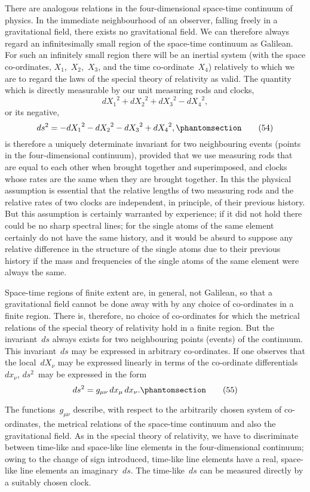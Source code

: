 \documentclass[12pt]{book}[2005/09/16]
\newcommand{\Change}[2]{#2}
\newcommand{\Add}[1]{\Change{}{#1}}
\newcommand{\PageSep}[1]{\ignorespaces}
\newcommand{\Tag}[1]{%
  \phantomsection
  \label{eqn:#1}
  \tag*{#1}
}
\begin{document}
There are analogous relations in the four-dimensional
\PageSep{70}
space-time continuum of physics. In the immediate
neighbourhood of an observer, falling freely in a gravitational
field, there exists no gravitational field. We
can therefore always regard an infinitesimally small
region of the space-time continuum as Galilean. For
such an infinitely small region there will be an inertial
system (with the space co-ordinates, $X_{1}$,~$X_{2}$,~$X_{3}$, and the
time co-ordinate~$X_{4}$) relatively to which we are to regard
the laws of the special theory of relativity as valid. The
quantity which is directly measurable by our unit
measuring rods and clocks,
\[
{dX_{1}}^{2} + {dX_{2}}^{2} + {dX_{3}}^{2} - {dX_{4}}^{2}\Add{,}
\]
or its negative,
\[
ds^{2} = -{dX_{1}}^{2} - {dX_{2}}^{2} - {dX_{3}}^{2} + {dX_{4}}^{2}\Add{,}
\Tag{(54)}
\]
is therefore a uniquely determinate invariant for two
neighbouring events (points in the four-dimensional
continuum), provided that we use measuring rods that
are equal to each other when brought together and
superimposed, and clocks whose rates are the same
when they are brought together. In this the physical
assumption is essential that the relative lengths of two
measuring rods and the relative rates of two clocks are
independent, in principle, of their previous history. But
this assumption is certainly warranted by experience;
if it did not hold there could be no sharp spectral lines;
for the single atoms of the same element certainly do
not have the same history, and it would be absurd to
suppose any relative difference in the structure of the
\PageSep{71}
single atoms due to their previous history if the mass
and frequencies of the single atoms of the same element
were always the same.

Space-time regions of finite extent are, in general,
not Galilean, so that a gravitational field cannot be done
away with by any choice of co-ordinates in a finite
region. There is, therefore, no choice of co-ordinates
for which the metrical relations of the special theory of
relativity hold in a finite region. But the invariant~$ds$
always exists for two neighbouring points (events) of
the continuum. This invariant~$ds$ may be expressed in
arbitrary co-ordinates. If one observes that the local~$dX_{\nu}$
may be expressed linearly in terms of the co-ordinate
differentials~$dx_{\nu}$, $ds^{2}$~may be expressed in the
form
\[
ds^{2} = g_{\mu\nu}\, dx_{\mu}\, dx_{\nu}\Add{.}
\Tag{(55)}
\]

The functions~$g_{\mu\nu}$ describe, with respect to the arbitrarily
chosen system of co-ordinates, the metrical relations
of the space-time continuum and also the
gravitational field. As in the special theory of relativity,
we have to discriminate between time-like and space-like
line elements in the four-dimensional continuum;
owing to the change of sign introduced, time-like
line elements have a real, space-like line elements an
imaginary~$ds$. The time-like~$ds$ can be measured directly
by a suitably chosen clock.
\end{document}
